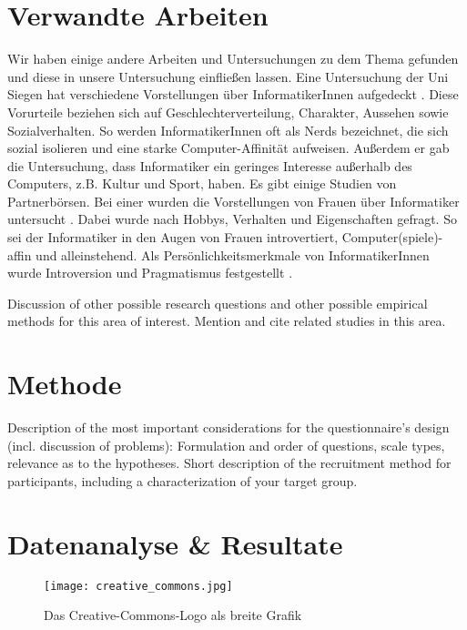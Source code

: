 \documentclass[de]{agse-empir-report}\usepackage[]{graphicx}\usepackage[]{color}
\begin{document}
\lipsum[2]


\section[kk]{Verwandte Arbeiten}
Wir haben einige andere Arbeiten und Untersuchungen zu dem Thema gefunden und diese in unsere Untersuchung einfließen lassen. Eine Untersuchung der Uni Siegen hat verschiedene Vorstellungen über InformatikerInnen aufgedeckt \cite{Weber09}. Diese Vorurteile beziehen sich auf Geschlechterverteilung, Charakter, Aussehen sowie Sozialverhalten. So werden InformatikerInnen oft als Nerds bezeichnet, die sich sozial isolieren und eine starke Computer-Affinität aufweisen. Außerdem er gab die Untersuchung, dass Informatiker ein geringes Interesse außerhalb des Computers, z.B. Kultur und Sport, haben. 
Es gibt einige Studien von Partnerbörsen. Bei einer wurden die Vorstellungen von Frauen über Informatiker untersucht \cite{partnersuche.de}. Dabei wurde nach Hobbys, Verhalten und Eigenschaften gefragt. So sei der Informatiker in den Augen von Frauen introvertiert, Computer(spiele)-affin und alleinstehend. Als Persönlichkeitsmerkmale von InformatikerInnen wurde Introversion und Pragmatismus festgestellt \cite{parship}.

Discussion of other possible research questions and other possible
empirical methods for this area of interest.
Mention and cite related studies in this area.

\lipsum[3]


\section[hs]{Methode}

Description of the most important considerations for the
questionnaire's design (incl. discussion of problems):
Formulation and order of questions, scale types, relevance as to the
hypotheses.
Short description of the recruitment method for participants,
including a characterization of your target group.

\lipsum[4]


\section[pb]{Datenanalyse \& Resultate}

\begin{figure*}
    \texttt{[image: creative\_commons.jpg]}
    \caption{Das Creative-Commons-Logo als breite Grafik}
\end{figure*}
\end{document}
